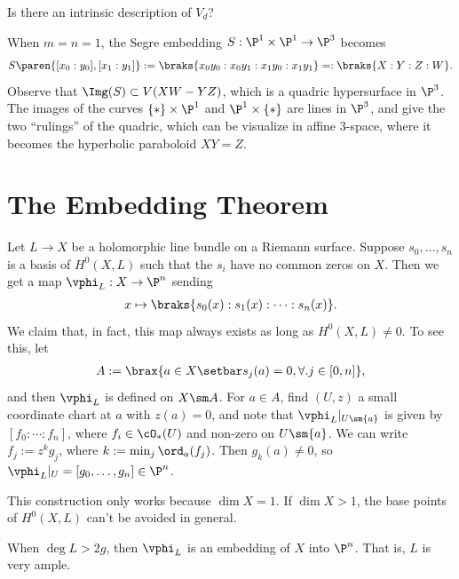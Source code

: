 \documentclass[11pt]{report}
\begin{document}
\begin{que}
Is there an intrinsic description of $V_d$?
\end{que}

\begin{ex}
When $m=n=1$, the Segre embedding $S:\P^1 \times \P^1 \to \P^3$ becomes
\begin{align*}
S\paren{[x_0:y_0],[x_1:y_1]} := \braks{x_0y_0:x_0y_1:x_1y_0:x_1y_1}=:\braks{X:Y:Z:W}.
\end{align*}
Observe that $\Img(S) \subset V(XW-YZ)$, which is a quadric hypersurface in $\P^3$. The images of the curves $\{*\} \times \P^1$ and $\P^1 \times \{*\}$ are lines in $\P^3$, and give the two ``rulings'' of the quadric, which can be visualize in affine 3-space, where it becomes the hyperbolic paraboloid $XY=Z$.
\end{ex}

\section{The Embedding Theorem}

Let $L \to X$ be a holomorphic line bundle on a Riemann surface. Suppose $s_0,\dots,s_n$ is a basis of $H^0(X,L)$ such that the $s_i$ have no common zeros on $X$. Then we get a map $\vphi_L:X \to \P^n$ sending
\begin{align*}
x \mapsto \braks{s_0(x):s_1(x):\cdots : s_n(x)}.
\end{align*}
We claim that, in fact, this map always exists as long as $H^0(X,L) \ne 0$. To see this, let 
\begin{align*}
A:= \brax{a \in X \setbar s_j(a) = 0, \forall.j \in [0,n]},
\end{align*}
and then $\vphi_L$ is defined on $X \sm A$. For $a \in A$, find $(U,z)$ a small coordinate chart at $a$ with $z(a) = 0$, and note that $\vphi_L|_{U \sm \{a\}}$ is given by $[f_0:\cdots :f_n]$, where $f_i \in \cO_*(U)$ and non-zero on $U \sm \{a\}$. We can write $f_j:=z^kg_j$, where $k :=\min_j \ord_a(f_j)$. Then $g_k(a)\ne 0$, so $\vphi_L|_U=[g_0,\dots,g_n] \in \P^n$.

\begin{rmk}
This construction only works because $\dim X = 1$. If $\dim X>1$, the base points of $H^0(X,L)$ can't be avoided in general.
\end{rmk}

\begin{thm} \label{thm:embedding-thm}
When $\deg L >2g$, then $\vphi_L$ is an embedding of $X$ into $\P^n$. That is, $L$ is very ample.
\end{thm}
\end{document}
